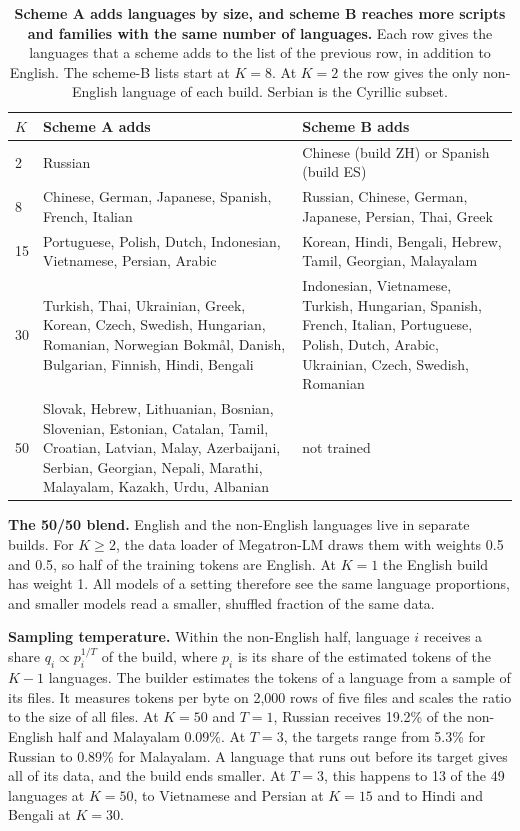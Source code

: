 \begin{table}[t]
\centering
\small
\setlength{\tabcolsep}{4pt}
\begin{tabular*}{\textwidth}{@{\extracolsep{\fill}}lp{}p{}@{}}
\toprule
$K$ & Scheme A adds & Scheme B adds \\
\midrule
2 & Russian & Chinese (build ZH) or Spanish (build ES) \\
8 & Chinese, German, Japanese, Spanish, French, Italian & Russian, Chinese, German, Japanese, Persian, Thai, Greek \\
15 & Portuguese, Polish, Dutch, Indonesian, Vietnamese, Persian, Arabic & Korean, Hindi, Bengali, Hebrew, Tamil, Georgian, Malayalam \\
30 & Turkish, Thai, Ukrainian, Greek, Korean, Czech, Swedish, Hungarian, Romanian, Norwegian Bokm\aa{}l, Danish, Bulgarian, Finnish, Hindi, Bengali & Indonesian, Vietnamese, Turkish, Hungarian, Spanish, French, Italian, Portuguese, Polish, Dutch, Arabic, Ukrainian, Czech, Swedish, Romanian \\
50 & Slovak, Hebrew, Lithuanian, Bosnian, Slovenian, Estonian, Catalan, Tamil, Croatian, Latvian, Malay, Azerbaijani, Serbian, Georgian, Nepali, Marathi, Malayalam, Kazakh, Urdu, Albanian & not trained \\
\bottomrule
\end{tabular*}
\caption{\textbf{Scheme A adds languages by size, and scheme B reaches more scripts and families with the same number of languages.} Each row gives the languages that a scheme adds to the list of the previous row, in addition to English. The scheme-B lists start at $K=8$. At $K=2$ the row gives the only non-English language of each build. Serbian is the Cyrillic subset.}
\label{tab:dcard-languages}
\end{table}

\textbf{The 50/50 blend.} English and the non-English languages live in separate builds. For $K \ge 2$, the data loader of Megatron-LM draws them with weights 0.5 and 0.5, so half of the training tokens are English. At $K=1$ the English build has weight 1. All models of a setting therefore see the same language proportions, and smaller models read a smaller, shuffled fraction of the same data.

\textbf{Sampling temperature.} Within the non-English half, language $i$ receives a share $q_i \propto p_i^{1/T}$ of the build, where $p_i$ is its share of the estimated tokens of the $K-1$ languages. The builder estimates the tokens of a language from a sample of its files. It measures tokens per byte on 2,000 rows of five files and scales the ratio to the size of all files. At $K=50$ and $T=1$, Russian receives 19.2\% of the non-English half and Malayalam 0.09\%. At $T=3$, the targets range from 5.3\% for Russian to 0.89\% for Malayalam. A language that runs out before its target gives all of its data, and the build ends smaller. At $T=3$, this happens to 13 of the 49 languages at $K=50$, to Vietnamese and Persian at $K=15$ and to Hindi and Bengali at $K=30$.

